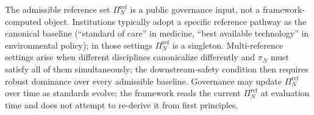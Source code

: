 \begin{remark}
\label{rem:reference_pathway}
The admissible reference set $\Pi_N^{\mathrm{ref}}$ is a public
governance input, not a framework-computed object.  Institutions
typically adopt a specific reference pathway as the canonical
baseline (``standard of care'' in medicine, ``best available
technology'' in environmental policy); in those settings
$\Pi_N^{\mathrm{ref}}$ is a singleton.  Multi-reference settings
arise when different disciplines canonicalize differently and
$\pi_N$ must satisfy all of them simultaneously; the
downstream-safety condition then requires robust dominance over
every admissible baseline.  Governance may update
$\Pi_N^{\mathrm{ref}}$ over time as standards evolve; the
framework reads the current $\Pi_N^{\mathrm{ref}}$ at evaluation
time and does not attempt to re-derive it from first principles.
\end{remark}

